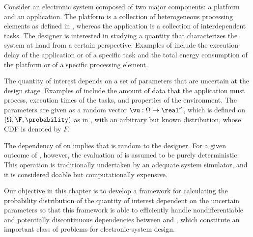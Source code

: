 Consider an electronic system composed of two major components: a platform and
an application. The platform is a collection of heterogeneous processing
elements as defined in , whereas the application is a
collection of interdependent tasks. The designer is interested in studying a
quantity \g that characterizes the system at hand from a certain perspective.
Examples of \g include the execution delay of the application or of a specific
task and the total energy consumption of the platform or of a specific
processing element.

The quantity of interest \g depends on a set of parameters \vu that are
uncertain at the design stage. Examples of \vu include the amount of data that
the application must process, execution times of the tasks, and properties of
the environment. The parameters \vu are given as a random vector $\vu: \Omega
\to \real^\nu$, which is defined on $(\Omega, \F, \probability)$ as in
, with an arbitrary but known distribution, whose
\ac{CDF} is denoted by $F$.

The dependency of \g on \vu implies that \g is random to the designer. For a
given outcome of \vu, however, the evaluation of \g is assumed to be purely
deterministic. This operation is traditionally undertaken by an adequate system
simulator, and it is considered doable but computationally expensive.

Our objective in this chapter is to develop a framework for calculating the
probability distribution of the quantity of interest \g dependent on the
uncertain parameters \vu so that this framework is able to efficiently handle
nondifferentiable and potentially discontinuous dependencies between \g and \vu,
which constitute an important class of problems for electronic-system design.
